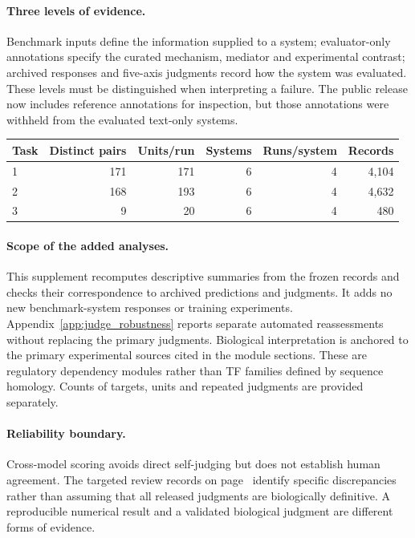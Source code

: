\paragraph{Three levels of evidence.} Benchmark inputs define the information supplied to a system; evaluator-only annotations specify the curated mechanism, mediator and experimental contrast; archived responses and five-axis judgments record how the system was evaluated. These levels must be distinguished when interpreting a failure. The public release now includes reference annotations for inspection, but those annotations were withheld from the evaluated text-only systems.
\begin{center}
\begin{tabular}{lrrrrr}
\toprule
Task & Distinct pairs & Units/run & Systems & Runs/system & Records \\
\midrule
1 & 171 & 171 & 6 & 4 & 4,104 \\
2 & 168 & 193 & 6 & 4 & 4,632 \\
3 & 9 & 20 & 6 & 4 & 480 \\
\bottomrule
\end{tabular}
\end{center}
\paragraph{Scope of the added analyses.} This supplement recomputes descriptive summaries from the frozen records and checks their correspondence to archived predictions and judgments. It adds no new benchmark-system responses or training experiments. Appendix~\ref{app:judge_robustness} reports separate automated reassessments without replacing the primary judgments. Biological interpretation is anchored to the primary experimental sources cited in the module sections. These are regulatory dependency modules rather than TF families defined by sequence homology. Counts of targets, units and repeated judgments are provided separately.

\paragraph{Reliability boundary.} Cross-model scoring avoids direct self-judging but does not establish human agreement. The targeted review records on page~\pageref{app:concentration} identify specific discrepancies rather than assuming that all released judgments are biologically definitive. A reproducible numerical result and a validated biological judgment are different forms of evidence.

